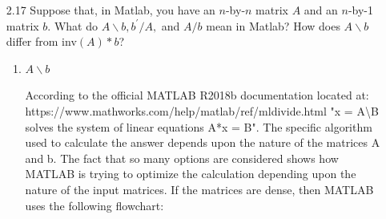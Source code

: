 \documentclass[12pt,letterpaper,reqno]{amsart}
\begin{document}
\begin{enumerate}
\newpage
\item[2.17] Suppose that, in Matlab, you have an $n$-by-$n$ matrix $A$ and an $n$-by-1 matrix $b$. What do $A\backslash b, b^\prime/A,$ and $A/b$ mean in Matlab? How does $A\backslash b$ differ from inv$(A) *b$?
\newline
\begin{flushleft}
\begin{enumerate}
    \item $A\backslash b$
    \begin{flushleft}
    According to the official MATLAB R2018b documentation located at: https://www.mathworks.com/help/matlab/ref/mldivide.html \newline
    "x = A\textbackslash B solves the system of linear equations A*x = B". The specific algorithm used to calculate the answer depends upon the nature of the matrices A and b. The fact that so many options are considered shows how MATLAB is trying to optimize the calculation depending upon the nature of the input matrices. If the matrices are dense, then MATLAB uses the following flowchart:\newline
    

\end{flushleft}
\end{enumerate}
\end{flushleft}
\end{enumerate}
\end{document}
